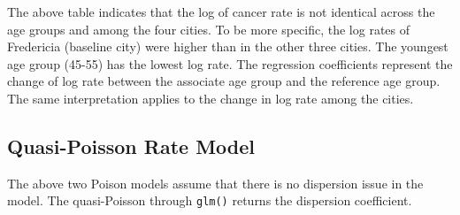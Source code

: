 \documentclass[
]{book}
\newenvironment{Shaded}{\begin{snugshade}}{\end{snugshade}}
\newcommand{\AttributeTok}[1]{\textcolor[rgb]{0.13,0.29,0.53}{#1}}
\newcommand{\FunctionTok}[1]{\textcolor[rgb]{0.13,0.29,0.53}{\textbf{#1}}}
\newcommand{\NormalTok}[1]{#1}
\newcommand{\OtherTok}[1]{\textcolor[rgb]{0.56,0.35,0.01}{#1}}
\newcommand{\SpecialCharTok}[1]{\textcolor[rgb]{0.81,0.36,0.00}{\textbf{#1}}}
\newcommand{\StringTok}[1]{\textcolor[rgb]{0.31,0.60,0.02}{#1}}
\begin{document}
The above table indicates that the log of cancer rate is not identical across the age groups and among the four cities. To be more specific, the log rates of Fredericia (baseline city) were higher than in the other three cities. The youngest age group (45-55) has the lowest log rate. The regression coefficients represent the change of log rate between the associate age group and the reference age group. The same interpretation applies to the change in log rate among the cities.

\hfill\break

\hypertarget{quasi-poisson-rate-model}{%
\subsection{Quasi-Poisson Rate Model}\label{quasi-poisson-rate-model}}

The above two Poison models assume that there is no dispersion issue in the model. The quasi-Poisson through \texttt{glm()} returns the dispersion coefficient.

\begin{Shaded}
\end{Shaded}
\end{document}
